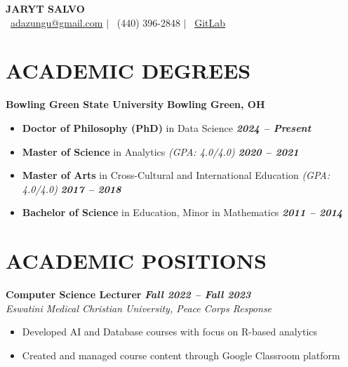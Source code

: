 \documentclass[11pt,letterpaper]{article}
\newcommand{\header}[4]{
    \begin{center}
        {\Huge\textbf{#1}}\\[6pt]
        {\color{accent}
        \faEnvelope\ \href{mailto:#2}{#2} $|$ 
        \faPhone\ #3 $|$ 
        \faGithub\ \href{#4}{GitLab}}
    \end{center}
    \vspace{-1em}
}
\begin{document}
\header{JARYT SALVO}{adazungu@gmail.com}{(440) 396-2848}{https://gitlab.com/ds-w-clojure/projects-shell}

\section{ACADEMIC DEGREES}

\textbf{Bowling Green State University} \hfill \textbf{Bowling Green, OH}
\begin{itemize}
    \item \textbf{Doctor of Philosophy (PhD)} in Data Science \hfill \textbf{\textit{2024 -- Present}}
    \item \textbf{Master of Science} in Analytics \textit{(GPA: 4.0/4.0)} \hfill \textbf{\textit{2020 -- 2021}}
    \item \textbf{Master of Arts} in Cross-Cultural and International Education \textit{(GPA: 4.0/4.0)} \hfill \textbf{\textit{2017 -- 2018}}
    \item \textbf{Bachelor of Science} in Education, Minor in Mathematics \hfill \textbf{\textit{2011 -- 2014}}
\end{itemize}

\section{ACADEMIC POSITIONS}

\textbf{Computer Science Lecturer} \hfill \textbf{\textit{Fall 2022 -- Fall 2023}} \\
\textit{Eswatini Medical Christian University, Peace Corps Response}
\begin{itemize}
    \item Developed AI and Database courses with focus on R-based analytics
    \item Created and managed course content through Google Classroom platform
\end{itemize}
\end{document}
